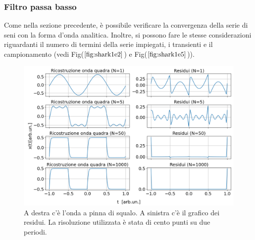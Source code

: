 \documentclass{article}
\begin{document}
        \subsubsection{Filtro passa basso}
            \label{sez:int_quadra}
            Come nella sezione precedente, è possibile verificare la convergenza della serie di 
            seni con la forma d'onda analitica.
            Inoltre, si possono fare le stesse considerazioni riguardanti 
            il numero di termini della serie impiegati, i transienti e il campionamento
            (vedi Fig($\ref{fig:shark1e2}$) e Fig($\ref{fig:shark1e5}$)).
                    \begin{figure}[H]
                        \centering
                        \includegraphics[width=1\textwidth]{fousharkfins1e2.png} %
                        \caption{A destra c'è l'onda a pinna di squalo.
                        A sinistra c'è il grafico dei residui.
                        La risoluzione utilizzata è stata di cento punti su due periodi.}
                        \label{fig:shark1e2}
                    \end{figure}
\end{document}
